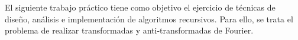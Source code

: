 	El siguiente trabajo práctico tiene como objetivo el ejercicio de técnicas de diseño, análisis e implementación de algoritmos recursivos. Para ello, se trata el problema de realizar transformadas y anti-transformadas de Fourier.


